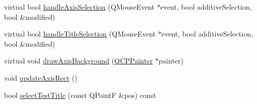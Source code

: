 \begin{DoxyCompactItemize}
virtual bool \hyperlink{a00116_a6085478fe8ba07b2a192cf8217133cb3}{handle\+Axis\+Selection} (Q\+Mouse\+Event $\ast$event, bool additive\+Selection, bool \&modified)
\item 
virtual bool \hyperlink{a00116_ae688ab743e775cd0c69941a082dd32e3}{handle\+Title\+Selection} (Q\+Mouse\+Event $\ast$event, bool additive\+Selection, bool \&modified)
\item 
virtual void \hyperlink{a00116_a2ddc6669cdcd1224803f78e579858b16}{draw\+Axis\+Background} (\hyperlink{a00047}{Q\+C\+P\+Painter} $\ast$painter)
\item 
void \hyperlink{a00116_a428242419d3a1b63f2cbff637986c35c}{update\+Axis\+Rect} ()
\item 
bool \hyperlink{a00116_a2a2d01a092840ac01b16104f7973f831}{select\+Test\+Title} (const Q\+Point\+F \&pos) const 
\end{DoxyCompactItemize}
